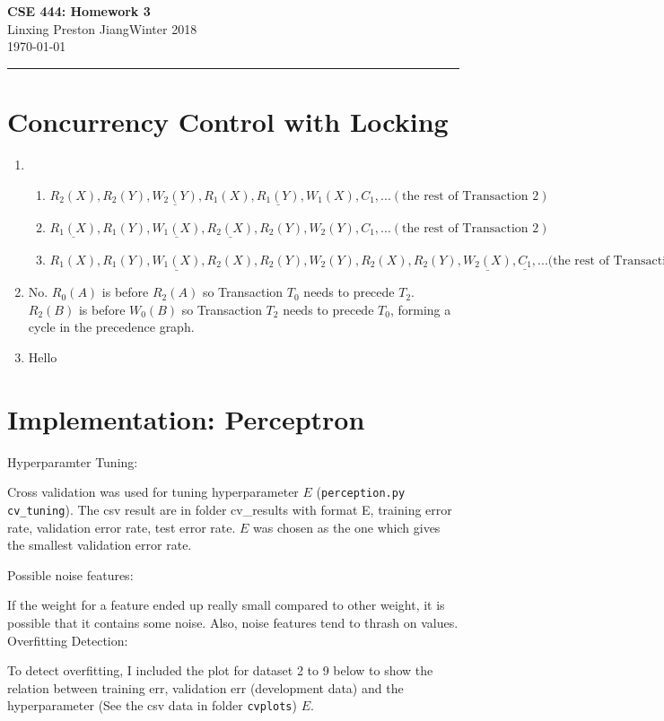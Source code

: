 \documentclass[10pt]{article}
\newcommand{\myname}{Linxing Preston Jiang}
\newcommand{\quarter}{Winter 2018}
\newcommand{\myhwname}{\textbf{CSE 444: Homework 3}}
\begin{document}
\begin{center}
	{\Large \myhwname} \\
	\vspace{.05in} 
    \myname\quad\quarter \\
	\vspace{.05in} 
    \today \\
\end{center}
\vspace{.15in} \hrule \vspace{0.5em}%

\section{Concurrency Control with Locking}
	\begin{enumerate}
		\item
		\begin{enumerate}[label=(\alph*)]
			\item $R_2(X), R_2(Y), \underline{W_2(Y)}, R_1(X), \underline{R_1(Y)}, W_1(X), C_1, ... (\text{the rest of Transaction 2})$
			\item $\underline{R_1(X)}, R_1(Y), \underline{W_1(X)}, \underline{R_2(X)}, R_2(Y), W_2(Y), C_1, ... (\text{the rest of Transaction 2})$
            \item $R_1(X), R_1(Y), \underline{W_1(X)}, R_2(X), R_2(Y), W_2(Y), R_2(X), R_2(Y), \underline{W_2(X)}, \underline{C_1}, ... (\text{the rest of Transaction 2}$
		\end{enumerate}

		\item No. $R_0(A)$ is before $R_2(A)$ so Transaction $T_0$ needs to precede $T_2$. $R_2(B)$ is before $W_0(B)$
			so Transaction $T_2$ needs to precede $T_0$, forming a cycle in the precedence graph.

		\item Hello
	\end{enumerate}


\newpage
\section{Implementation: Perceptron}
Hyperparamter Tuning: \par
Cross validation was used for tuning hyperparameter $E$ (\texttt{perception.py cv\_tuning}). The csv result are in folder cv\_results with format E, training error rate, validation error rate, test error rate.
$E$ was chosen as the one which gives the smallest validation error rate.  \par
Possible noise features: \par
If the weight for a feature ended up really small compared to other weight, it is possible that it contains some noise. Also, noise features tend to thrash on values. 
Overfitting Detection: \par
To detect overfitting, I included the plot for dataset 2 to 9 below to show the relation between training err, validation err (development data) and the hyperparameter (See the csv data in folder \texttt{cvplots})
$E$. \par
\end{document}
